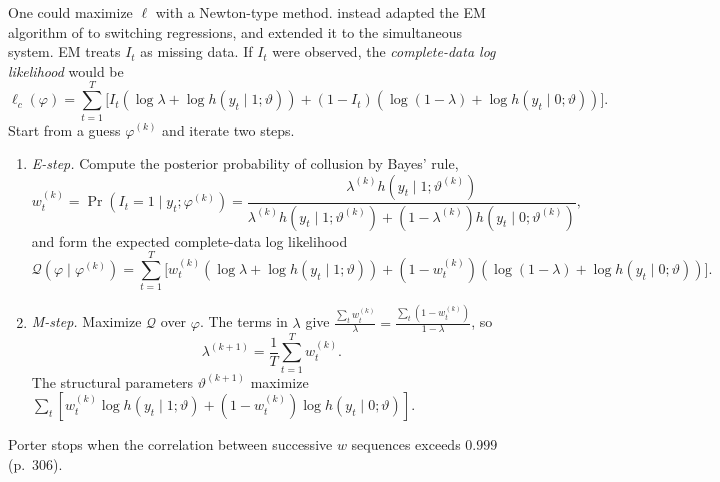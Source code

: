 One could maximize $\ell$ with a Newton-type method.  instead adapted the EM algorithm of
\citet{DempsterLairdRubin1977} to switching regressions, and \citet{Porter1983} extended it to the simultaneous
system. EM treats $I_t$ as missing data. If $I_t$ were observed, the \emph{complete-data log likelihood} would be
\begin{equation*}
  \ell_c(\varphi) = \sum_{t=1}^T \Big[ I_t\left(\log\lambda + \log h(y_t\mid 1;\vartheta)\right)
  + (1 - I_t)\left(\log(1-\lambda) + \log h(y_t \mid 0;\vartheta)\right)\Big].
\end{equation*}
Start from a guess $\varphi^{(k)}$ and iterate two steps.
\begin{enumerate}
\item \emph{E-step.} Compute the posterior probability of collusion by Bayes' rule,
\begin{equation}\label{eq:13-estep}
  w_t^{(k)} = \Pr\left(I_t = 1 \mid y_t; \varphi^{(k)}\right)
  = \frac{\lambda^{(k)} h(y_t \mid 1;\vartheta^{(k)})}
         {\lambda^{(k)} h(y_t\mid 1;\vartheta^{(k)}) + (1-\lambda^{(k)})h(y_t \mid 0;\vartheta^{(k)})},
\end{equation}
and form the expected complete-data log likelihood
\begin{equation}\label{eq:13-Q}
  \mathcal{Q}(\varphi \mid \varphi^{(k)}) = \sum_{t=1}^T \Big[w_t^{(k)}\left(\log\lambda + \log h(y_t\mid 1;\vartheta)\right)
  + \left(1 - w_t^{(k)}\right)\left(\log(1-\lambda) + \log h(y_t\mid 0;\vartheta)\right)\Big].
\end{equation}
\item \emph{M-step.} Maximize $\mathcal{Q}$ over $\varphi$. The terms in $\lambda$ give
$\frac{\sum_t w_t^{(k)}}{\lambda} = \frac{\sum_t (1 - w_t^{(k)})}{1 - \lambda}$, so
\begin{equation}\label{eq:13-mstep-lambda}
  \lambda^{(k+1)} = \frac{1}{T}\sum_{t=1}^T w_t^{(k)} .
\end{equation}
The structural parameters $\vartheta^{(k+1)}$ maximize $\sum_t[w_t^{(k)}\log h(y_t\mid 1;\vartheta) +
(1 - w_t^{(k)})\log h(y_t \mid 0;\vartheta)]$.
\end{enumerate}
Porter stops when the correlation between successive $w$ sequences exceeds $0.999$ (p.~306).

